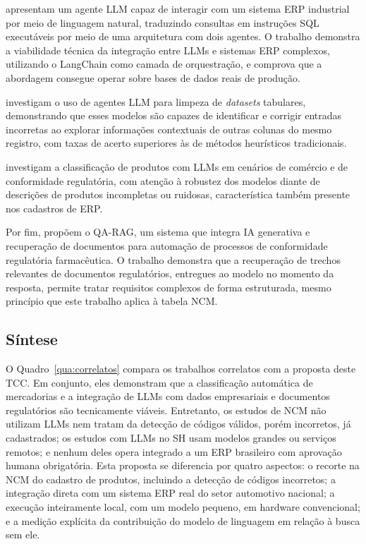  apresentam um agente LLM capaz de interagir com um sistema ERP industrial por meio de linguagem natural, traduzindo consultas em instruções SQL executáveis por meio de uma arquitetura com dois agentes. O trabalho demonstra a viabilidade técnica da integração entre LLMs e sistemas ERP complexos, utilizando o LangChain como camada de orquestração, e comprova que a abordagem consegue operar sobre bases de dados reais de produção.

 investigam o uso de agentes LLM para limpeza de \textit{datasets} tabulares, demonstrando que esses modelos são capazes de identificar e corrigir entradas incorretas ao explorar informações contextuais de outras colunas do mesmo registro, com taxas de acerto superiores às de métodos heurísticos tradicionais.

 investigam a classificação de produtos com LLMs em cenários de comércio e de conformidade regulatória, com atenção à robustez dos modelos diante de descrições de produtos incompletas ou ruidosas, característica também presente nos cadastros de ERP.

Por fim,  propõem o QA-RAG, um sistema que integra IA generativa e recuperação de documentos para automação de processos de conformidade regulatória farmacêutica. O trabalho demonstra que a recuperação de trechos relevantes de documentos regulatórios, entregues ao modelo no momento da resposta, permite tratar requisitos complexos de forma estruturada, mesmo princípio que este trabalho aplica à tabela NCM.

\subsection{Síntese}

O Quadro~\ref{qua:correlatos} compara os trabalhos correlatos com a proposta deste TCC. Em conjunto, eles demonstram que a classificação automática de mercadorias e a integração de LLMs com dados empresariais e documentos regulatórios são tecnicamente viáveis. Entretanto, os estudos de NCM não utilizam LLMs nem tratam da detecção de códigos válidos, porém incorretos, já cadastrados; os estudos com LLMs no SH usam modelos grandes ou serviços remotos; e nenhum deles opera integrado a um ERP brasileiro com aprovação humana obrigatória. Esta proposta se diferencia por quatro aspectos: o recorte na NCM do cadastro de produtos, incluindo a detecção de códigos incorretos; a integração direta com um sistema ERP real do setor automotivo nacional; a execução inteiramente local, com um modelo pequeno, em hardware convencional; e a medição explícita da contribuição do modelo de linguagem em relação à busca sem ele.

